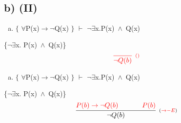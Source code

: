 \documentclass[aspectratio=43]{beamer}
\newcommand{\ria}{$\rightarrow$}
\newcommand{\fall}{$\forall$}
\newcommand{\ex}{$\exists$}
\newcommand{\nao}{$\neg$}
\newcommand{\nex}{\nao\ex}
\newcommand{\andd}{$\wedge$}
\begin{document}
    \subsection{b) (II)}
    
    \begin{frame}[fragile]
    	
    	\begin{enumerate}[b)]
			
			\item $\{$ \fall P(x)\ria \nao Q(x) $\}$ $\vdash$ \nex  x.P(x)\ \andd\ Q(x) \\ 
			
		\end{enumerate}
        \{\nex  x. P(x)\ \andd\ Q(x)\}
        \vspace{100pt}
        \[
        \begin{array}{c}
		
        	\textcolor{red}{
            \infer[_{()}]
            {$\nao$ Q(b)}
            {}
            }
		\end{array}
        \]
        
	\end{frame}
    
    \begin{frame}[fragile]
    	
    	\begin{enumerate}[b)]
			
			\item $\{$ \fall P(x)\ria \nao Q(x) $\}$ $\vdash$ \nex x.P(x)\ \andd\ Q(x) \\ 
			
		\end{enumerate}
        \{\nex  x. P(x)\ \andd\ Q(x)\}
        \vspace{95pt}
        \[
        \begin{array}{c}
		
        	\infer[_{(\textcolor{red}{\to-E})}]
            {$\nao$ Q(b)}
            {\textcolor{red}{
            P(b) \rightarrow \neg Q(b) 
            \hspace{35pt}
            P(b)
            }
            }
		\end{array}
        \]
        
	\end{frame}
    
\end{document}

